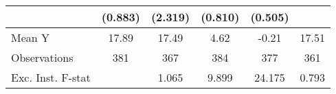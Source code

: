 {\begin{tabular}{l*{5}{c}}
            &     (0.883)         &     (2.319)         &     (0.810)         &     (0.505)         &                     \\
\midrule
Mean Y      &       17.89         &       17.49         &        4.62         &       -0.21         &       17.51         \\
Observations&         381         &         367         &         384         &         377         &         361         \\
Exc. Inst. F-stat&                     &       1.065         &       9.899         &      24.175         &       0.793         \\
\bottomrule
\end{tabular}
}

